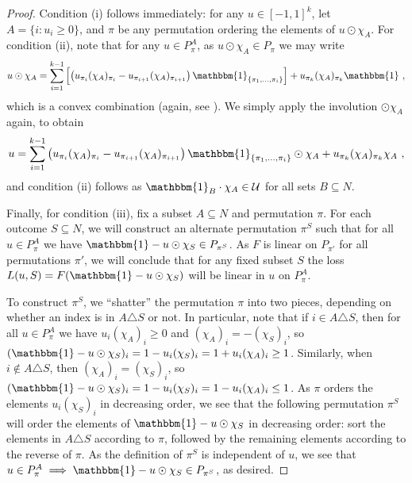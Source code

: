 \documentclass[11pt]{article}
\newcommand{\Comments}{1}
\newcommand{\mytodo}[2]{\ifnum\Comments=1%
  \todo[linecolor=#1!80!black,backgroundcolor=#1,bordercolor=#1!80!black]{#2}\fi}
\newcommand{\jessiet}[1]{\mytodo{teal!20!white}{JF: #1}}
\newcommand{\U}{\mathcal{U}}
\newcommand{\ones}{\mathbbm{1}}
\begin{document}
\begin{proof}
	Condition (i) follows immediately: for any $u\in[-1,1]^k$, let $A = \{i:u_i\geq 0\}$, and $\pi$ be any permutation ordering the elements of $u \odot \chi_A$.
	For condition (ii), note that for any $u\in P^A_\pi$, as $u\odot \chi_A \in P_\pi$ we may write
	\begin{equation}
	\label{eq:udot-conv}
	u \odot \chi_A = \sum_{i=1}^{k-1} \left[ \left( u_{\pi_i} (\chi_A)_{\pi_i} - u_{\pi_{i+1}} (\chi_A)_{\pi_{i+1}} \right) \ones_{\{\pi_1,\ldots,\pi_i\}} \right] + u_{\pi_k} (\chi_A)_{\pi_k} \ones
	~,
	\end{equation}
	which is a convex combination (again, see \citet[pg.\ 167]{bach2013learning}).
	We simply apply the involution $\odot\chi_A$ again, to obtain
	\begin{equation}
	\label{eq:udot-conv}
	u = \sum_{i=1}^{k-1} \left( u_{\pi_i} (\chi_A)_{\pi_i} - u_{\pi_{i+1}} (\chi_A)_{\pi_{i+1}} \right) \ones_{\{\pi_1,\ldots,\pi_i\}}\odot \chi_A + u_{\pi_k} (\chi_A)_{\pi_k} \chi_A
	~,
	\end{equation}
	and condition (ii) follows as $\ones_B \cdot \chi_A \in \U$ for all sets $B\subseteq N$.
	
	Finally, for condition (iii), fix a subset $A\subseteq N$ and permutation $\pi$.
	For each outcome $S\subseteq N$, we will construct an alternate permutation $\pi^S$ such that for all $u\in P^A_\pi$ we have $\ones - u\odot\chi_S \in P_{\pi^S}$.
	As $F$ is linear on $P_{\pi'}$ for all permutations $\pi'$, we will conclude that for any fixed subset $S$ the loss $L(u,S) = F(\ones - u\odot\chi_S)$ will be linear in $u$ on $P^A_\pi$.
	
	To construct $\pi^S$, we ``shatter'' the permutation $\pi$ into two pieces, depending on whether an index is in $A\triangle S$ or not.
	In particular, note that if $i\in A\triangle S$, then for all $u\in P^A_\pi$ we have $u_i(\chi_A)_i \geq 0$ and $(\chi_A)_i = -(\chi_S)_i$, so $(\ones - u\odot\chi_S)_i = 1 - u_i(\chi_S)_i = 1 + u_i(\chi_A)_i \geq 1$.
	Similarly, when $i\notin A\triangle S$, then $(\chi_A)_i = (\chi_S)_i$, so $(\ones - u\odot\chi_S)_i = 1 - u_i(\chi_S)_i = 1 - u_i(\chi_A)_i \leq 1$.
	As $\pi$ orders the elements $u_i(\chi_S)_i$ in decreasing order, we see that the following permutation $\pi^S$ will order the elements of $\ones - u\odot\chi_S$ in decreasing order: sort the elements in $A\triangle S$ according to $\pi$, followed by the remaining elements according to the reverse of $\pi$.
	As the definition of $\pi^S$ is independent of $u$, we see that $u\in P^A_\pi \implies \ones - u\odot\chi_S \in P_{\pi^S}$, as desired.
\end{proof}
\end{document}
